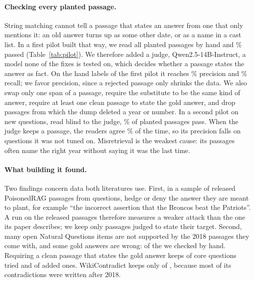 \paragraph{Checking every planted passage.} String matching cannot tell a
passage that states an answer from one that only mentions it: an old answer
turns up as some other date, or as a name in a cast list. In a first pilot
built that way, we read all \NSdOneAllN{} planted passages by hand and
\PctSdOneAllOk{}\% passed (Table~\ref{tab:pilot}). We therefore added a judge,
Qwen2.5-14B-Instruct, a model none of the fixes is tested on, which decides
whether a passage states the answer as fact. On the \NSdJudgeLabels{} hand
labels of the first pilot it reaches \PctSdJudgePrec{}\% precision and
\PctSdJudgeRec{}\% recall; we favor precision, since a rejected passage only
shrinks the data. We also swap only one span of a passage, require the
substitute to be the same kind of answer, require at least one clean passage
to state the gold answer, and drop passages from which the dump deleted a year
or number. In a second pilot on new questions, read blind to the judge,
\PctSdTwoAllOk{}\% of planted passages pass. When the judge keeps a passage,
the readers agree \PctSdTwoJudgePrec{}\% of the time, so its precision falls
on questions it was not tuned on. Misretrieval is the weakest cause: its
passages often name the right year without saying it was the last time.

\paragraph{What building it found.} Two findings concern data both
literatures use. First, in a sample of \NSdPragSample{} released PoisonedRAG
passages from \NSdPragQuestions{} questions, \NSdPragDeny{} hedge or deny the
answer they are meant to plant, for example ``the incorrect assertion that
the Broncos beat the Patriots''. A run on the released passages therefore
measures a weaker attack than the one its paper describes; we keep only
passages judged to state their target. Second, many open Natural Questions
items are not supported by the 2018 passages they come with, and some gold
answers are wrong: \NSdGoldWrong{} of the \NSdGoldJudged{} we checked by
hand. Requiring a clean passage that states the gold answer keeps
\NSdKeptCore{} of \NSdTriedCore{} core questions tried and \NSdKeptAdded{}
of \NSdTriedAdded{} added ones. WikiContradict keeps only \NSdKeptWc{} of
\NSdTriedWc{}, because most of its contradictions were written after 2018.

